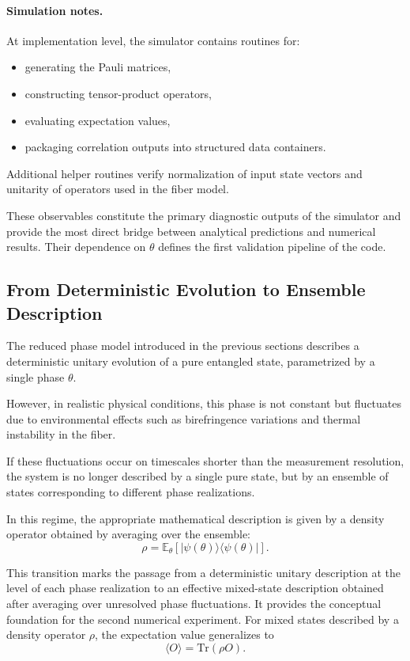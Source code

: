 \documentclass[a4paper]{article}
\begin{document}
\paragraph{Simulation notes.}
At implementation level, the simulator contains routines for:
\begin{itemize}
    \item generating the Pauli matrices,
    \item constructing tensor-product operators,
    \item evaluating expectation values,
    \item packaging correlation outputs into structured data containers.
\end{itemize}

Additional helper routines verify normalization of input state vectors and unitarity of operators used in the fiber model.

These observables constitute the primary diagnostic outputs of the simulator and provide the most direct bridge between analytical predictions and numerical results. Their dependence on \(\theta\) defines the first validation pipeline of the code.

\subsection{From Deterministic Evolution to Ensemble Description}

The reduced phase model introduced in the previous sections describes a deterministic unitary evolution of a pure entangled state, parametrized by a single phase \(\theta\).

However, in realistic physical conditions, this phase is not constant but fluctuates due to environmental effects such as birefringence variations and thermal instability in the fiber.

If these fluctuations occur on timescales shorter than the measurement resolution, the system is no longer described by a single pure state, but by an ensemble of states corresponding to different phase realizations.

In this regime, the appropriate mathematical description is given by a density operator obtained by averaging over the ensemble:
\[
\rho = \mathbb{E}_{\theta}\left[ |\psi(\theta)\rangle\langle \psi(\theta)| \right].
\]

This transition marks the passage from a deterministic unitary description at the level of each phase realization to an effective mixed-state description obtained after averaging over unresolved phase fluctuations. It provides the conceptual foundation for the second numerical experiment.
For mixed states described by a density operator \(\rho\), the expectation value generalizes to
\[
\langle O \rangle = \mathrm{Tr}(\rho O).
\]
\end{document}
